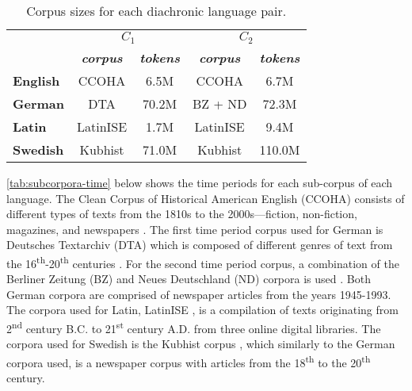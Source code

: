 \begin{table}[h]
\centering
\begin{tabular}{lcccc} 
\toprule
\textbf{}        & \multicolumn{2}{c}{\textbf{$C_1$}}                  & \multicolumn{2}{c}{\textbf{$C_2$}}                   \\
                 & \textit{\textbf{corpus}} & \textit{\textbf{tokens}} & \textit{\textbf{corpus}} & \textit{\textbf{tokens}}  \\ 
\cline{2-5}
\textbf{English} & CCOHA                    & 6.5M                     & CCOHA                    & 6.7M                      \\
\textbf{German}  & DTA                      & 70.2M                    & BZ + ND                  & 72.3M                     \\
\textbf{Latin}   & LatinISE                 & 1.7M                     & LatinISE                 & 9.4M                      \\
\textbf{Swedish} & Kubhist                  & 71.0M                    & Kubhist                  & 110.0M                    \\
\bottomrule
\end{tabular}
\caption{Corpus sizes for each diachronic language pair.}
\label{tab:subcorpora-size}
\end{table}

\autoref{tab:subcorpora-time} below shows the time periods for each sub-corpus of each language. The Clean Corpus of Historical American English (CCOHA) consists of different types of texts from the 1810s to the 2000s—fiction, non-fiction, magazines, and newspapers \citep{davies2012expanding, alatrash-etal-2020-ccoha}. The first time period corpus used for German is Deutsches Textarchiv (DTA) which is composed of different genres of text from the 16\textsuperscript{th}-20\textsuperscript{th} centuries \citep{dta2017}. For the second time period corpus, a combination of the Berliner Zeitung (BZ) and Neues Deutschland (ND) corpora is used \citep{berliner2018,neues2018}. Both German corpora are comprised of newspaper articles from the years 1945-1993. The corpora used for Latin, LatinISE \citep{mcgillivray-kilgarriff}, is a compilation of texts originating from 2\textsuperscript{nd} century B.C. to 21\textsuperscript{st} century A.D. from three online digital libraries. The corpora used for Swedish is the Kubhist corpus \citep{Kubhist}, which similarly to the German corpora used, is a newspaper corpus with articles from the 18\textsuperscript{th} to the 20\textsuperscript{th} century. \hfill \break


